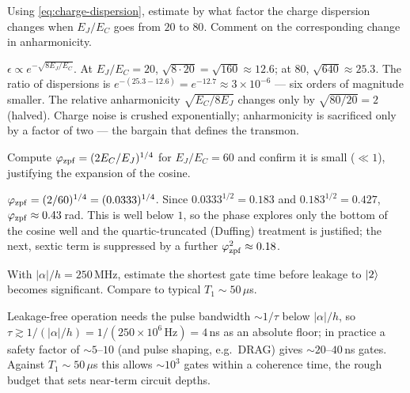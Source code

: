 \begin{exercise}[Choosing $E_J/E_C$]
Using \cref{eq:charge-dispersion}, estimate by what factor the charge
dispersion changes when $E_J/E_C$ goes from $20$ to $80$. Comment on
the corresponding change in anharmonicity.
\begin{solution}
$\epsilon\propto e^{-\sqrt{8E_J/E_C}}$. At $E_J/E_C=20$,
$\sqrt{8\cdot20}=\sqrt{160}\approx12.6$; at $80$,
$\sqrt{640}\approx25.3$. The ratio of dispersions is
$e^{-(25.3-12.6)}=e^{-12.7}\approx3\times10^{-6}$ --- six orders of
magnitude smaller. The relative anharmonicity
$\sqrt{E_C/8E_J}$ changes only by $\sqrt{80/20}=2$ (halved). Charge
noise is crushed exponentially; anharmonicity is sacrificed only by a
factor of two --- the bargain that defines the transmon.
\end{solution}
\end{exercise}

\begin{exercise}
Compute $\varphi_{\rm zpf}=(2E_C/E_J)^{1/4}$ for $E_J/E_C=60$ and
confirm it is small ($\ll1$), justifying the expansion of the cosine.
\begin{solution}
$\varphi_{\rm zpf}=(2/60)^{1/4}=(0.0333)^{1/4}$. Since
$0.0333^{1/2}=0.183$ and $0.183^{1/2}=0.427$, $\varphi_{\rm zpf}\approx0.43\,$rad.
This is well below $1$, so the phase explores only the bottom of the
cosine well and the quartic-truncated (Duffing) treatment is justified;
the next, sextic term is suppressed by a further
$\varphi_{\rm zpf}^2\approx0.18$.
\end{solution}
\end{exercise}

\begin{exercise}
With $|\alpha|/h=250\,$MHz, estimate the shortest gate time before
leakage to $\ket2$ becomes significant. Compare to typical $T_1\sim
50\,\mu$s.
\begin{solution}
Leakage-free operation needs the pulse bandwidth
$\sim1/\tau$ below $|\alpha|/h$, so
$\tau\gtrsim1/(|\alpha|/h)=1/(250\times10^6\,\text{Hz})=4\,$ns as an
absolute floor; in practice a safety factor of $\sim5$--$10$ (and pulse
shaping, e.g.\ DRAG) gives $\sim20$--$40\,$ns gates. Against
$T_1\sim50\,\mu$s this allows $\sim10^3$ gates within a coherence time,
the rough budget that sets near-term circuit depths.
\end{solution}
\end{exercise}

